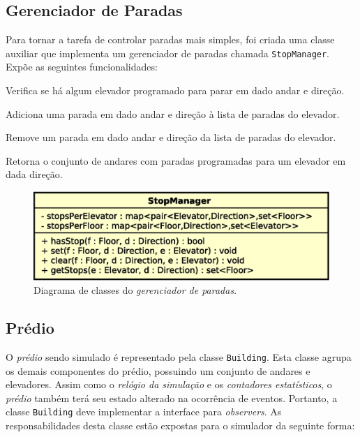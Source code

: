 \subsection{Gerenciador de Paradas}

  Para tornar a tarefa de controlar paradas mais simples, foi criada uma classe
  auxiliar que implementa um gerenciador de paradas chamada
  \texttt{StopManager}. Expõe as seguintes funcionalidades:

  \begin{description}[leftmargin=!,labelwidth=\widthof{\bfseries arrivalFloor}]\setlength\itemsep{0mm}
    \item[\texttt{hasStop}] Verifica se há algum elevador programado para parar em dado andar e direção.
    \item[\texttt{set}] Adiciona uma parada em dado andar e direção à lista de paradas do elevador.
    \item[\texttt{clear}] Remove um parada em dado andar e direção da lista de paradas do elevador.
    \item[\texttt{getStops}] Retorna o conjunto de andares com paradas programadas para um elevador em dada direção.
  \end{description}

  \begin{figure}[htb!]
    \centering
    \includegraphics[scale=0.6]{img/StopManager}
    \caption{Diagrama de classes do \textit{gerenciador de paradas}.}
  \label{fig:diagram:stopmanager}
  \end{figure}

\subsection{Prédio} \label{model:state:building}

O \textit{prédio} sendo simulado é representado pela classe \texttt{Building}.
Esta classe agrupa os demais componentes do prédio, possuindo um conjunto de
andares e elevadores. Assim como o \textit{relógio da simulação} e os
\textit{contadores estatísticos}, o \textit{prédio} também terá seu estado
alterado na ocorrência de eventos. Portanto, a classe \texttt{Building} deve
implementar a interface para \textit{observers}. As responsabilidades desta
classe estão expostas para o simulador da seguinte forma:


